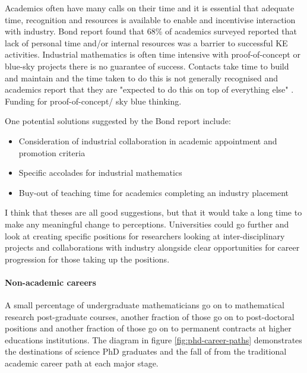\documentclass[11pt]{article} %
\begin{document}
	Academics often have many calls on their time and it is essential that adequate time, recognition and resources is available to enable and incentivise interaction with industry. Bond report \cite{Bond} found that  68\% of academics surveyed reported that lack of personal time and/or internal resources was a barrier to successful KE activities.  
	Industrial mathematics is often time intensive with proof-of-concept or blue-sky projects there is no guarantee of success. Contacts take time to build and maintain and the time taken to do this is not generally recognised and academics report that they are "expected to do this on top of everything else" \cite{Bond}. Funding for proof-of-concept/ sky blue thinking.
	
	One potential solutions suggested by the Bond report include: 
	\begin{itemize}
		\item Consideration of industrial collaboration in academic appointment and promotion criteria
		\item Specific accolades for industrial mathematics
		\item Buy-out of teaching time for academics completing an industry placement
	\end{itemize} 

I think that theses are all good suggestions, but that it would take a long time to make any meaningful change to perceptions. Universities could go further and look at creating specific positions  for researchers looking at inter-disciplinary projects and collaborations with industry alongside clear opportunities for career progression for those taking up the positions. 

\paragraph{Non-academic careers}

A small percentage of undergraduate mathematicians go on to mathematical research post-graduate courses, another fraction of those go on to post-doctoral positions and another fraction of those go on to permanent contracts at higher educations institutions. The diagram in figure \ref{fig:phd-career-paths} demonstrates the destinations of science PhD graduates and the fall of from the traditional academic career path at each major stage. 
\end{document}
